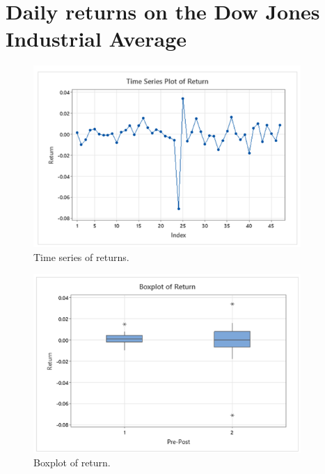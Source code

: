 \documentclass[12pt]{article}
\begin{document}
\section{Daily returns on the Dow Jones Industrial Average}
\begin{figure}
\begin{center}
\includegraphics[width=4in]{images/return-time-series.png}
\end{center}
\caption{Time series of returns.\label{fig:returntimeseries}}
\end{figure}
\begin{figure}
\begin{center}
\includegraphics[width=4in]{images/return-boxplot.png}
\end{center}
\caption{Boxplot of return.}
\end{figure}
\end{document}
